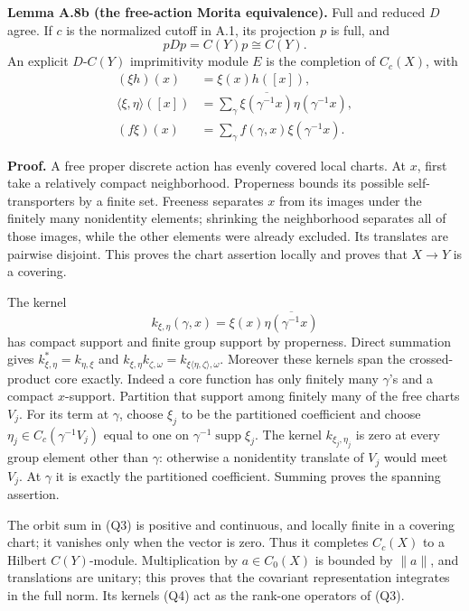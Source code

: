 \documentclass[
  11pt,
]{article}
\begin{document}
\textbf{Lemma A.8b (the free-action Morita equivalence).} Full and
reduced \(D\) agree. If \(c\) is the normalized cutoff in A.1, its
projection \(p\) is full, and \[
 pDp=C(Y)p\cong C(Y).
 \tag{Q2}
\] An explicit \(D\)-\(C(Y)\) imprimitivity module \(E\) is the
completion of \(C_c(X)\), with \[
 \begin{split}
 (\xi h)(x)&=\xi(x)h([x]),\\
 \langle\xi,\eta\rangle([x])
   &=\sum_{\gamma}\overline{\xi(\gamma^{-1}x)}\eta(\gamma^{-1}x),\\
 (f\xi)(x)&=\sum_{\gamma}f(\gamma,x)\xi(\gamma^{-1}x).
 \end{split}
 \tag{Q3}
\]

\textbf{Proof.} A free proper discrete action has evenly covered local
charts. At \(x\), first take a relatively compact neighborhood.
Properness bounds its possible self-transporters by a finite set.
Freeness separates \(x\) from its images under the finitely many
nonidentity elements; shrinking the neighborhood separates all of those
images, while the other elements were already excluded. Its translates
are pairwise disjoint. This proves the chart assertion locally and
proves that \(X\to Y\) is a covering.

The kernel \[
 k_{\xi,\eta}(\gamma,x)
       =\xi(x)\overline{\eta(\gamma^{-1}x)}
 \tag{Q4}
\] has compact support and finite group support by properness. Direct
summation gives \(k_{\xi,\eta}^*=k_{\eta,\xi}\) and
\(k_{\xi,\eta}k_{\zeta,\omega}
 =k_{\xi\langle\eta,\zeta\rangle,\omega}\). Moreover these kernels span
the crossed-product core exactly. Indeed a core function has only
finitely many \(\gamma\)'s and a compact \(x\)-support. Partition that
support among finitely many of the free charts \(V_j\). For its term at
\(\gamma\), choose \(\xi_j\) to be the partitioned coefficient and
choose \(\eta_j\in C_c(\gamma^{-1}V_j)\) equal to one on
\(\gamma^{-1}\operatorname{supp}\xi_j\). The kernel \(k_{\xi_j,\eta_j}\)
is zero at every group element other than \(\gamma\): otherwise a
nonidentity translate of \(V_j\) would meet \(V_j\). At \(\gamma\) it is
exactly the partitioned coefficient. Summing proves the spanning
assertion.

The orbit sum in (Q3) is positive and continuous, and locally finite in
a covering chart; it vanishes only when the vector is zero. Thus it
completes \(C_c(X)\) to a Hilbert \(C(Y)\)-module. Multiplication by
\(a\in C_0(X)\) is bounded by \(\|a\|\), and translations are unitary;
this proves that the covariant representation integrates in the full
norm. Its kernels (Q4) act as the rank-one operators of (Q3).
\end{document}
